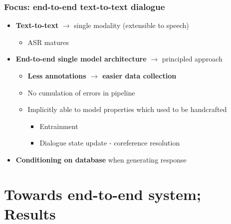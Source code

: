 \documentclass[10pt, compress,british,xcolor={svgnames,dvipsnames,x11names},trans]{beamer}
\begin{document}
\begin{frame}\frametitle{Focus: end-to-end text-to-text dialogue}
    \begin{itemize}
        \item {\bf Text-to-text} $\longrightarrow$ single modality (extensible to speech)
            \begin{itemize}
                \item ASR matures 
            \end{itemize}
        \item {\bf End-to-end single model architecture} $\longrightarrow$ principled approach
            \begin{itemize}
                \item {\bf Less annotations $\longrightarrow$ easier data collection}
                \item No cumulation of errors in pipeline
                \item Implicitly able to model properties which used to be handcrafted 
                \begin{itemize}
                    \item Entrainment
                    \item Dialogue state update - coreference resolution
                \end{itemize}
            \end{itemize}
        \item {\bf Conditioning on database} when generating response 
    \end{itemize}
\end{frame}

\section{Towards end-to-end system; Results}  %
\end{document}
